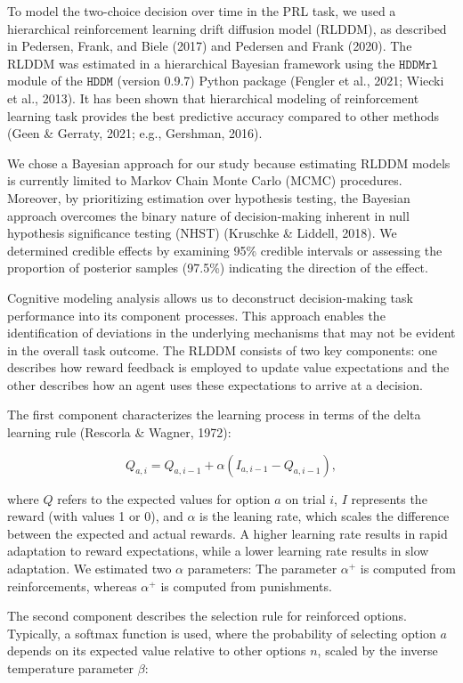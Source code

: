 \documentclass[
  man,floatsintext]{apa6}
\begin{document}
To model the two-choice decision over time in the PRL task, we used a hierarchical reinforcement learning drift diffusion model (RLDDM), as described in Pedersen, Frank, and Biele (2017) and Pedersen and Frank (2020). The RLDDM was estimated in a hierarchical Bayesian framework using the \(\texttt{HDDMrl}\) module of the \(\texttt{HDDM}\) (version 0.9.7) Python package (Fengler et al., 2021; Wiecki et al., 2013). It has been shown that hierarchical modeling of reinforcement learning task provides the best predictive accuracy compared to other methods (Geen \& Gerraty, 2021; e.g., Gershman, 2016).

We chose a Bayesian approach for our study because estimating RLDDM models is currently limited to Markov Chain Monte Carlo (MCMC) procedures. Moreover, by prioritizing estimation over hypothesis testing, the Bayesian approach overcomes the binary nature of decision-making inherent in null hypothesis significance testing (NHST) (Kruschke \& Liddell, 2018). We determined credible effects by examining 95\% credible intervals or assessing the proportion of posterior samples (97.5\%) indicating the direction of the effect.

Cognitive modeling analysis allows us to deconstruct decision-making task performance into its component processes. This approach enables the identification of deviations in the underlying mechanisms that may not be evident in the overall task outcome. The RLDDM consists of two key components: one describes how reward feedback is employed to update value expectations and the other describes how an agent uses these expectations to arrive at a decision.

The first component characterizes the learning process in terms of the delta learning rule (Rescorla \& Wagner, 1972):

\[
Q_{a, i} = Q_{a, i-1} + \alpha (I_{a, i-1} - Q_{a, i-1}),
\]

\noindent
where \(Q\) refers to the expected values for option \(a\) on trial \(i\), \(I\) represents the reward (with values 1 or 0), and \(\alpha\) is the leaning rate, which scales the difference between the expected and actual rewards. A higher learning rate results in rapid adaptation to reward expectations, while a lower learning rate results in slow adaptation. We estimated two \(\alpha\) parameters: The parameter \(\alpha^+\) is computed from reinforcements, whereas \(\alpha^+\) is computed from punishments.

The second component describes the selection rule for reinforced options. Typically, a softmax function is used, where the probability of selecting option \(a\) depends on its expected value relative to other options \(n\), scaled by the inverse temperature parameter \(\beta\):
\end{document}

